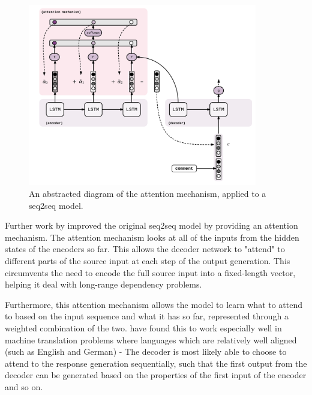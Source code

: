 \documentclass[12pt,twoside]{report}
\begin{document}
\begin{figure}[!ht]
      
	\centering
	\includegraphics[width=100mm]{diagrams/seq2seq_attention_mechanism.pdf}
	\caption{An abstracted diagram of the attention mechanism, applied to a seq2seq model.\label{seq2seq_attn}}
\end{figure}

Further work by \cite{bahdanau_neural_2014} improved the original seq2seq model by providing an attention mechanism. The attention mechanism looks at all of the inputs from the hidden states of the encoders so far. This allows the decoder network to "attend" to different parts of the source input at each step of the output generation. This circumvents the need to encode the full source input into a fixed-length vector, helping it deal with long-range dependency problems.

Furthermore, this attention mechanism allows the model to learn what to attend to based on the input sequence and what it has so far, represented through a weighted combination of the two. \cite{bahdanau_neural_2014} have found this to work especially well in machine translation problems where languages which are relatively well aligned (such as English and German) - The decoder is most likely able to choose to attend to the response generation sequentially, such that the first output from the decoder can be generated based on the properties of the first input of the encoder and so on.

\end{document}

